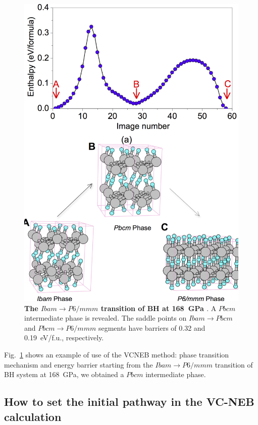 \documentclass[12pt]{article}
\begin{document}
\begin{figure}[htbp] \centering
\includegraphics[scale=1.3]{pic/VCNEB_BH}
\caption{\footnotesize \textbf{The $Ibam$$\rightarrow$$P6/mmm$ transition of BH
at 168~GPa \cite{Qian2013}}. A $Pbcm$ intermediate phase is revealed. The saddle
points on $Ibam$$\rightarrow$$Pbcm$ and $Pbcm$$\rightarrow$$P6/mmm$ segments
have barriers of 0.32 and 0.19~eV/f.u., respectively.}
\label{fig:VCNEB_BH}
\end{figure}

\vspace{1.0cm}

Fig.~\ref{fig:VCNEB_BH} shows an example of use of the VCNEB method: phase
transition mechanism and energy barrier starting from the
$Ibam$$\rightarrow$$P6/mmm$ transition of BH system at 168~GPa, we obtained a
$Pbcm$ intermediate phase.

\newpage
\subsection{How to set the initial pathway in the VC-NEB calculation}
\end{document}
